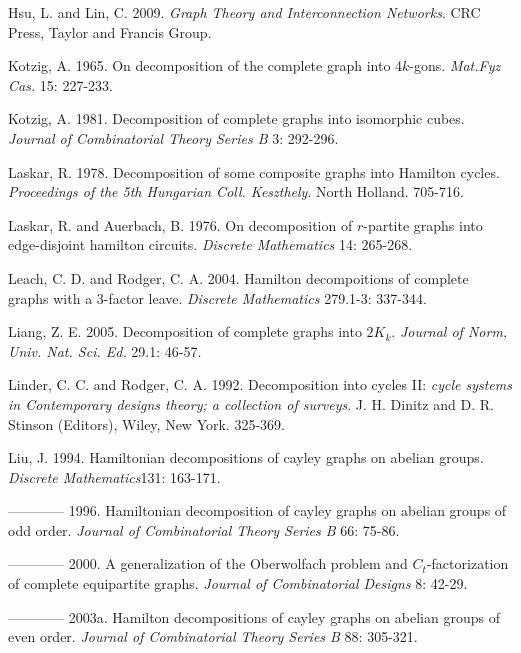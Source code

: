 \documentclass[12pt]{report}
\begin{document}
\begin{newpage}
\begin{description}
\item Hsu, L. and Lin, C. 2009. {\it Graph Theory and Interconnection
Networks}. CRC Press, Taylor and Francis Group.
\item Kotzig, A. 1965. On decomposition of the complete graph into
$4k$-gons. {\it Mat.Fyz Cas.} 15: 227-233.
\item Kotzig, A. 1981. Decomposition of complete graphs into isomorphic
cubes. {\it Journal of Combinatorial Theory Series B} 3: 292-296.
\item Laskar, R. 1978. Decomposition of some composite graphs into
Hamilton cycles. {\it Proceedings of the 5th Hungarian Coll.
Keszthely}. North Holland. 705-716.
\item Laskar, R. and Auerbach, B. 1976. On decomposition of $r$-partite
graphs into edge-disjoint hamilton circuits. {\it Discrete
Mathematics} 14: 265-268.
\item Leach, C. D. and Rodger, C. A. 2004. Hamilton decompoitions of
complete graphs with a $3$-factor leave. {\it Discrete Mathematics}
279.1-3: 337-344.
\item Liang, Z. E. 2005. Decomposition of complete graphs into $2K_k$.
{\it Journal of Norm, Univ. Nat. Sci. Ed.} 29.1: 46-57.
\item Linder, C. C. and Rodger, C. A. 1992.  Decomposition into cycles II:
{\it cycle systems in Contemporary designs theory; a collection
of surveys}. J. H. Dinitz and D. R. Stinson (Editors), Wiley,
New York. 325-369.
\item Liu, J. 1994. Hamiltonian decompositions of cayley graphs on abelian
groups. {\it Discrete Mathematics}131: 163-171.
\item ------------ 1996. Hamiltonian decomposition of cayley graphs on abelian groups of odd order. {\it Journal of Combinatorial Theory Series B} 66: 75-86.
\item ------------ 2000. A generalization of the Oberwolfach problem and
$C_t$-factorization of complete equipartite graphs. {\it Journal of Combinatorial Designs} 8: 42-29.
\item ------------ 2003a. Hamilton decompositions of cayley graphs on abelian
groups of even order. {\it Journal of Combinatorial Theory Series B} 88: 305-321.

\end{description}
\end{newpage}
\end{document}
